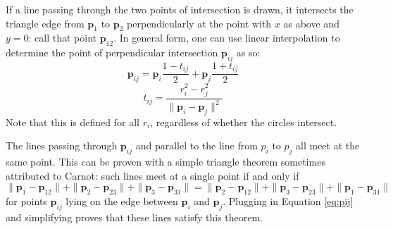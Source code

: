 \documentclass{amsart}[12pt]
\begin{document}
If a line passing through the two points of intersection is drawn, it intersects
the triangle edge from $\mathbf p_1$ to $\mathbf p_2$ perpendicularly at
the point with $x$ as above and $y=0$: call that point $\mathbf p_{12}$. In
general form, one can use linear interpolation to determine the point of
perpendicular intersection $\mathbf p_{ij}$ as so:
\begin{equation}\label{eq:pij}
\mathbf p_{ij} = \mathbf p_i \frac{1-t_{ij}}{2} + \mathbf p_j \frac{1+t_{ij}}{2}
\end{equation}
\begin{equation}
t_{ij} = \frac{r_i^2 - r_j^2}{\| \mathbf p_i - \mathbf p_j \|^2}
\end{equation}
Note that this is defined for all $r_i$, regardless of whether the circles
intersect.

The lines passing through $\mathbf p_{ij}$ and parallel to the line from
$p_i$ to $p_j$ all meet at the same point. This can be proven with a simple
triangle theorem sometimes attributed to Carnot: such lines meet at a single
point if and only if \cite{posamentier}\cite{wohlgemuth}
\begin{equation}
  \|\mathbf p_1 - \mathbf p_{12}\| +
  \|\mathbf p_2 - \mathbf p_{23}\| +
  \|\mathbf p_3 - \mathbf p_{31}\| =
  \|\mathbf p_2 - \mathbf p_{12}\| +
  \|\mathbf p_3 - \mathbf p_{23}\| +
  \|\mathbf p_1 - \mathbf p_{31}\|
\end{equation}
for points $\mathbf p_{ij}$ lying on the edge between $\mathbf p_i$ and
$\mathbf p_j$. Plugging in Equation \ref{eq:pij} and simplifying proves that
these lines satisfy this theorem.
\end{document}
